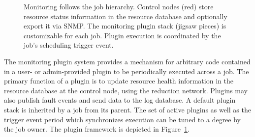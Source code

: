 \begin{figure}
\begin{minipage}[b]{0.4\linewidth}
\end{minipage}
\hspace{1cm}
\begin{minipage}[b]{0.4\linewidth}
\end{minipage}
\caption{Monitoring follows the job hierarchy.
Control nodes (red) store resource status information in the resource
database and optionally export it via SNMP.
The monitoring plugin stack (jigsaw pieces) is customizable for each job.
Plugin execution is coordinated by the job's scheduling trigger event.}
\label{FigMonEx1}
\end{figure}

The monitoring plugin system provides a mechanism for arbitrary code 
contained in a user- or admin-provided plugin to be periodically
executed across a job.
The primary function of a plugin is to 
update resource health information in the resource database at the control node,
using the reduction network.
Plugins may also publish fault events and send data to the log database.
A default plugin stack is inherited by a job from its parent.
The set of active plugins as well as the trigger event period
which synchronizes execution can be tuned to a degree by the job owner.
The plugin framework is depicted in Figure~\ref{FigMonEx1}.

